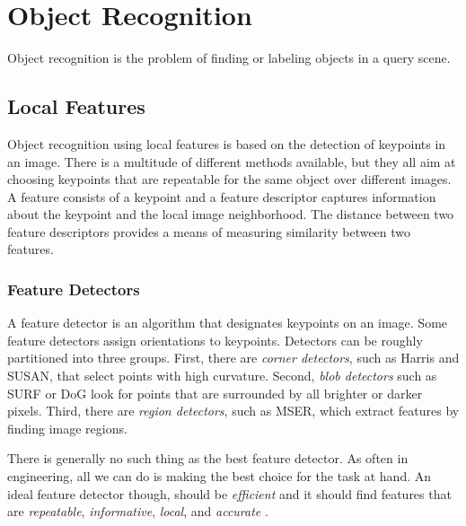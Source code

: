 
\section{Object Recognition}


Object recognition is the problem of finding or labeling objects in a query
scene.

\subsection{Local Features}

Object recognition using local features is based on the detection of keypoints
in an image. There is a multitude of different methods available, but they all
aim at choosing keypoints that are repeatable for the same object over
different images. A feature consists of a keypoint and a feature descriptor
captures information about the keypoint and the local image neighborhood.  The
distance between two feature descriptors provides a means of measuring
similarity between two features. 

\subsubsection{Feature Detectors}

A feature detector is an algorithm that designates keypoints on an image.  Some
feature detectors assign orientations to keypoints. Detectors can be roughly
partitioned into three groups. First, there are {\it corner detectors}, such as
Harris and SUSAN, that select points with high curvature. Second, {\it blob
detectors} such as SURF or DoG look for points that are surrounded by all
brighter or darker pixels.  Third, there are {\it region detectors}, such as
MSER, which extract features by finding image regions.

There is generally no such thing as the best feature detector. As often in
engineering, all we can do is making the best choice for the task at hand.  An
ideal feature detector though, should be {\it efficient} and it should find
features that are {\it repeatable}, {\it informative}, {\it local}, and {\it
accurate} \cite{Tuytelaars2007}.

